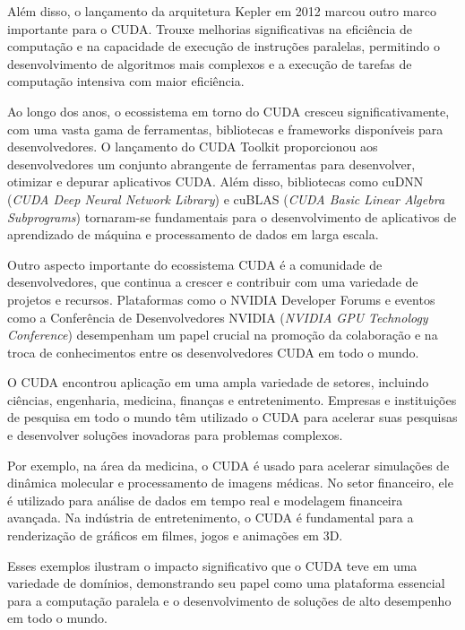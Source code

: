 \documentclass[12pt, %
openright, 
oneside, %
a4paper,    %
brazil]{facom-ufu-abntex2}
\begin{document}
Além disso, o lançamento da arquitetura Kepler em 2012 marcou outro marco importante para o CUDA. Trouxe melhorias significativas na eficiência de computação e na capacidade de execução de instruções paralelas, permitindo o desenvolvimento de algoritmos mais complexos e a execução de tarefas de computação intensiva com maior eficiência.

Ao longo dos anos, o ecossistema em torno do CUDA cresceu significativamente, com uma vasta gama de ferramentas, bibliotecas e frameworks disponíveis para desenvolvedores. O lançamento do CUDA Toolkit proporcionou aos desenvolvedores um conjunto abrangente de ferramentas para desenvolver, otimizar e depurar aplicativos CUDA. Além disso, bibliotecas como cuDNN (\textit{CUDA Deep Neural Network Library}) e cuBLAS (\textit{CUDA Basic Linear Algebra Subprograms}) tornaram-se fundamentais para o desenvolvimento de aplicativos de aprendizado de máquina e processamento de dados em larga escala.


Outro aspecto importante do ecossistema CUDA é a comunidade de desenvolvedores, que continua a crescer e contribuir com uma variedade de projetos e recursos. Plataformas como o NVIDIA Developer Forums e eventos como a Conferência de Desenvolvedores NVIDIA (\textit{NVIDIA GPU Technology Conference}) desempenham um papel crucial na promoção da colaboração e na troca de conhecimentos entre os desenvolvedores CUDA em todo o mundo.

O CUDA encontrou aplicação em uma ampla variedade de setores, incluindo ciências, engenharia, medicina, finanças e entretenimento. Empresas e instituições de pesquisa em todo o mundo têm utilizado o CUDA para acelerar suas pesquisas e desenvolver soluções inovadoras para problemas complexos.

Por exemplo, na área da medicina, o CUDA é usado para acelerar simulações de dinâmica molecular e processamento de imagens médicas. No setor financeiro, ele é utilizado para análise de dados em tempo real e modelagem financeira avançada. Na indústria de entretenimento, o CUDA é fundamental para a renderização de gráficos em filmes, jogos e animações em 3D.

Esses exemplos ilustram o impacto significativo que o CUDA teve em uma variedade de domínios, demonstrando seu papel como uma plataforma essencial para a computação paralela e o desenvolvimento de soluções de alto desempenho em todo o mundo.
\end{document}
